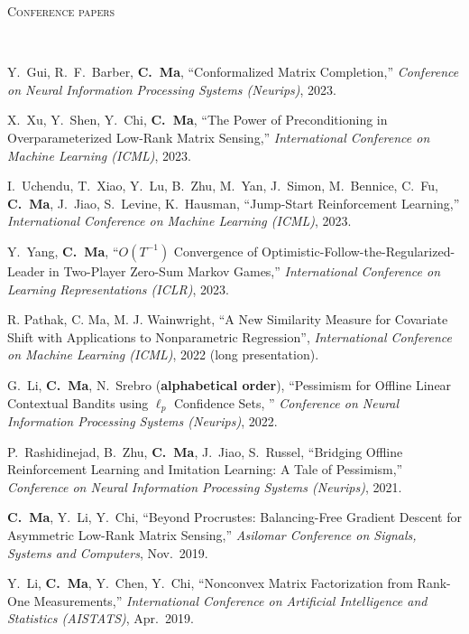 \documentclass[a4paper, 10pt]{article}
\newenvironment{changemargin}[2]{%
  \begin{list}{}{%
    \setlength{\topsep}{0pt}%
    \setlength{\leftmargin}{#1}%
    \setlength{\rightmargin}{#2}%
    \setlength{\listparindent}{\parindent}%
    \setlength{\itemindent}{\parindent}%
    \setlength{\parsep}{\parskip}%
  }%
  \item[]}{\end{list}
}
\newcommand{\lineover}{
	\begin{changemargin}{-0.05in}{-0.05in}
		\vspace*{-8pt}
		\hrulefill \\
		\vspace*{-2pt}
	\end{changemargin}
}
\newcommand{\header}[1]{
	\begin{changemargin}{-0.5in}{-0.5in}
		\scshape{#1}\\
  	\lineover
	\end{changemargin}
}
\newenvironment{body} {
	\vspace*{-16pt}
	\begin{changemargin}{-0.3in}{-0.5in}
  }	
	{\end{changemargin}
}
\begin{document}
\bigskip
\header{\LARGE{Conference papers}}
\begin{body}
	\vspace{18pt}
	\begin{enumerate}[label={[{C}{{\arabic*}}]}]
	
	
	\item Y.~Gui, R.~F.~Barber, \textbf{C.~Ma}, ``Conformalized Matrix Completion,'' \emph{Conference on Neural Information Processing Systems (Neurips)}, 2023.
	
	\item X.~Xu, Y.~Shen, Y.~Chi, \textbf{C.~Ma}, ``The Power of Preconditioning in Overparameterized Low-Rank Matrix Sensing,'' \emph{International Conference on Machine Learning (ICML)}, 2023.
	

	
	\item I.~Uchendu, T.~Xiao, Y.~Lu, B.~Zhu, M.~Yan, J.~Simon, M.~Bennice, C.~Fu, \textbf{C.~Ma}, J.~Jiao, S.~Levine, K.~Hausman, ``Jump-Start Reinforcement Learning,'' \emph{International Conference on Machine Learning (ICML)}, 2023.
	
		\item Y.~Yang, \textbf{C.~Ma}, {``$O(T^{-1})$ Convergence of Optimistic-Follow-the-Regularized-Leader in Two-Player Zero-Sum Markov Games,''} \emph{International Conference on Learning Representations (ICLR)}, 2023. \\
	
	\item R. Pathak, C. Ma, M. J. Wainwright, {``A New Similarity Measure for Covariate Shift with Applications to Nonparametric Regression''}, \emph{International Conference on Machine Learning (ICML)}, 2022 (long presentation).
	
	\item G.~Li, \textbf{C.~Ma}, N.~Srebro (\textbf{alphabetical order}), {``Pessimism for Offline Linear Contextual Bandits using $\ell_p$ Confidence Sets, ''} \emph{Conference on Neural Information Processing Systems (Neurips)}, 2022.
	\item P.~Rashidinejad, B.~Zhu, \textbf{C.~Ma}, J.~Jiao, S.~Russel, {``Bridging Offline Reinforcement Learning and Imitation Learning: A Tale of Pessimism,''} \emph{Conference on Neural Information Processing Systems (Neurips)}, 2021. \\
	
	\item \textbf{C.~Ma}, Y.~Li, Y.~Chi, {``Beyond Procrustes: Balancing-Free Gradient Descent for Asymmetric Low-Rank Matrix Sensing,''} \emph{Asilomar Conference on Signals, Systems and Computers}, Nov.~2019. \\
	\item 
	Y.~Li, \textbf{C.~Ma}, Y.~Chen, Y.~Chi, {{``Nonconvex Matrix Factorization from Rank-One Measurements,''}} \emph{International Conference on Artificial Intelligence and Statistics (AISTATS)}, Apr.~2019. \\
	

\end{enumerate}
\end{body}
\end{document}
